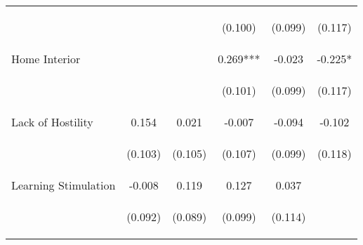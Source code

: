 \begin{tabular}{lccccc}
 & \begin{footnotesize}\end{footnotesize} & \begin{footnotesize}\end{footnotesize} & \begin{footnotesize}(0.100)\end{footnotesize} & \begin{footnotesize}(0.099)\end{footnotesize} & \begin{footnotesize}(0.117)\end{footnotesize}\\
\noalign{\smallskip}Home Interior &  &  & 0.269*** & -0.023 & -0.225*\\
 & \begin{footnotesize}\end{footnotesize} & \begin{footnotesize}\end{footnotesize} & \begin{footnotesize}(0.101)\end{footnotesize} & \begin{footnotesize}(0.099)\end{footnotesize} & \begin{footnotesize}(0.117)\end{footnotesize}\\
\noalign{\smallskip}Lack of Hostility & 0.154 & 0.021 & -0.007 & -0.094 & -0.102\\
 & \begin{footnotesize}(0.103)\end{footnotesize} & \begin{footnotesize}(0.105)\end{footnotesize} & \begin{footnotesize}(0.107)\end{footnotesize} & \begin{footnotesize}(0.099)\end{footnotesize} & \begin{footnotesize}(0.118)\end{footnotesize}\\
\noalign{\smallskip}Learning Stimulation & -0.008 & 0.119 & 0.127 & 0.037 & \\
 & \begin{footnotesize}(0.092)\end{footnotesize} & \begin{footnotesize}(0.089)\end{footnotesize} & \begin{footnotesize}(0.099)\end{footnotesize} & \begin{footnotesize}(0.114)\end{footnotesize} & \begin{footnotesize}\end{footnotesize}\\

\end{tabular}
